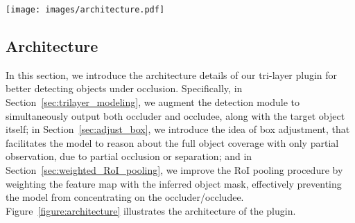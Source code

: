\documentclass{bmvc2k}
\begin{document}
\begin{figure*}[t]
\label{sec:network_architecture}
	\centering
	\texttt{[image: images/architecture.pdf]}
	\vspace{-12pt}
\caption{
\textcolor{bmvc_blue}{\textbf{Architecture and function of the plugin module. } There are three functions: (a) The tri-layer mask head (MH$_i$ shown in detail on the right) predicts the mask of the target object (the infant wiping food on their face), the occluder (the dining table), and the occludee (the chair) within the detection box B$_i$.   The feature embeddings of the occluder/occludee branch are concatenated to the target mask embedding as cues to help better predict the target object mask; (b) As shown on the left, the process of predicting the target mask is iterated (index $i$), such that the second iteration is able to adjust the initial box predictions and better detect partially occluded / separated objects; (c) After the first iteration,
 RoI features are pooled according to the predicted target mask to guide the model to focus more on the partially occluded / separated object itself. The notation used is: ``$I$'' for the input image, and ``BH'', ``MH'', ``B'', ``C'' refer to bbox head, mask head, bounding box, and classification respectively.}
}
\label{figure:architecture}
\vspace{-0.6cm}
\end{figure*}

\vspace{-0.2cm}
\subsection{Architecture}
\vspace{-0.1cm}
In this section, 
we  introduce the architecture details of our tri-layer plugin for better detecting objects under occlusion. Specifically, in Section~\ref{sec:trilayer_modeling},
we augment the detection module to simultaneously output both occluder and occludee, 
along with the target object itself;
in Section~\ref{sec:adjust_box}, we introduce the idea of box adjustment, 
that facilitates the model to reason about the full object coverage with only partial observation, 
due to partial occlusion or separation; and
in Section~\ref{sec:weighted_RoI_pooling}, 
we improve the RoI pooling procedure by weighting the feature map with the inferred object mask, effectively preventing the model from concentrating on the occluder/occludee.
Figure~\ref{figure:architecture} illustrates the architecture of the plugin.
\end{document}
